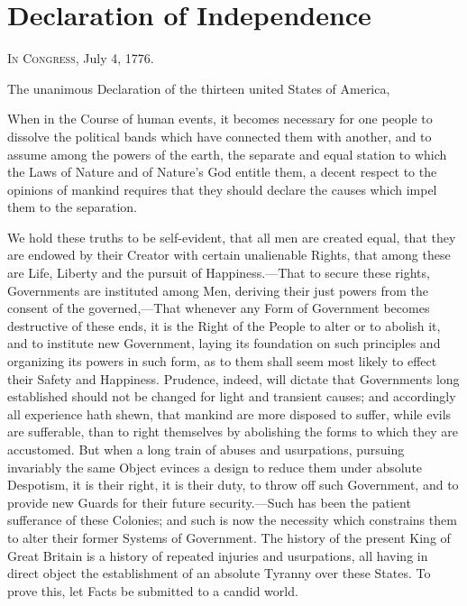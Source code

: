 
\author{Thomas Jefferson}
\chapter{Declaration of Independence}

\textsc{In Congress}, July 4, 1776.

\noindent The unanimous Declaration of the thirteen united States of
America,

When in the Course of human events, it becomes necessary for one
people to dissolve the political bands which have connected them with
another, and to assume among the powers of the earth, the separate and
equal station to which the Laws of Nature and of Nature's God entitle
them, a decent respect to the opinions of mankind requires that they
should declare the causes which impel them to the separation.


We hold these truths to be self-evident, that all men are created
equal, that they are endowed by their Creator with certain unalienable
Rights, that among these are Life, Liberty and the pursuit of
Happiness.---That to secure these rights, Governments are instituted
among Men, deriving their just powers from the consent of the
governed,---That whenever any Form of Government becomes destructive
of these ends, it is the Right of the People to alter or to abolish
it, and to institute new Government, laying its foundation on such
principles and organizing its powers in such form, as to them shall
seem most likely to effect their Safety and Happiness. Prudence,
indeed, will dictate that Governments long established should not be
changed for light and transient causes; and accordingly all experience
hath shewn, that mankind are more disposed to suffer, while evils are
sufferable, than to right themselves by abolishing the forms to which
they are accustomed. But when a long train of abuses and usurpations,
pursuing invariably the same Object evinces a design to reduce them
under absolute Despotism, it is their right, it is their duty, to
throw off such Government, and to provide new Guards for their future
security.---Such has been the patient sufferance of these Colonies;
and such is now the necessity which constrains them to alter their
former Systems of Government. The history of the present King of Great
Britain is a history of repeated injuries and usurpations, all
having in direct object the establishment of an absolute Tyranny over
these States. To prove this, let Facts be submitted to a candid
world.

